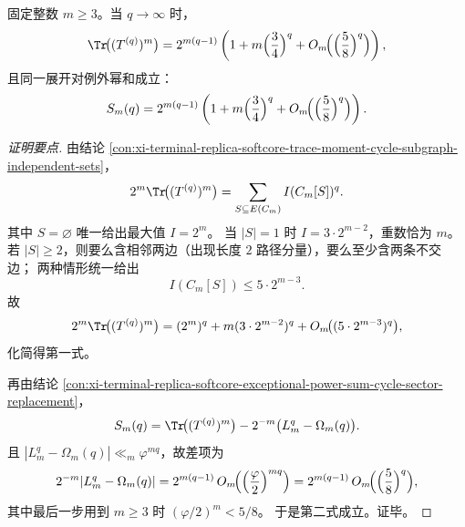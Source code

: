 \begin{conclusion}\label{con:xi-terminal-replica-softcore-large-q-two-layer-asymptotics}
固定整数 \(m\ge 3\)。当 \(q\to\infty\) 时，
\[
\Tr\!\bigl((T^{(q)})^m\bigr)
=2^{m(q-1)}
\left(
1+m\Bigl(\frac34\Bigr)^q+O_m\!\Bigl(\Bigl(\frac58\Bigr)^q\Bigr)
\right),
\]
且同一展开对例外幂和成立：
\[
S_m(q)
=2^{m(q-1)}
\left(
1+m\Bigl(\frac34\Bigr)^q+O_m\!\Bigl(\Bigl(\frac58\Bigr)^q\Bigr)
\right).
\]
\end{conclusion}
\begin{proof}[证明要点]
由结论 \ref{con:xi-terminal-replica-softcore-trace-moment-cycle-subgraph-independent-sets}，
\[
2^m\Tr\!\bigl((T^{(q)})^m\bigr)=\sum_{S\subseteq E(C_m)}I(C_m[S])^{q}.
\]
其中 \(S=\varnothing\) 唯一给出最大值 \(I=2^m\)。
当 \(|S|=1\) 时 \(I=3\cdot 2^{m-2}\)，重数恰为 \(m\)。
若 \(|S|\ge 2\)，则要么含相邻两边（出现长度 \(2\) 路径分量），要么至少含两条不交边；
两种情形统一给出
\[
I(C_m[S])\le 5\cdot 2^{m-3}.
\]
故
\[
2^m\Tr\!\bigl((T^{(q)})^m\bigr)
=(2^m)^q+m(3\cdot 2^{m-2})^q+O_m\!\bigl((5\cdot 2^{m-3})^q\bigr),
\]
化简得第一式。
\par
再由结论 \ref{con:xi-terminal-replica-softcore-exceptional-power-sum-cycle-sector-replacement}，
\[
S_m(q)=\Tr\!\bigl((T^{(q)})^m\bigr)-2^{-m}\bigl(L_m^q-\Omega_m(q)\bigr).
\]
且 \(|L_m^q-\Omega_m(q)|\ll_m \varphi^{mq}\)，故差项为
\[
2^{-m}|L_m^q-\Omega_m(q)|
=2^{m(q-1)}\,O_m\!\Bigl(\Bigl(\frac{\varphi}{2}\Bigr)^{mq}\Bigr)
=2^{m(q-1)}\,O_m\!\Bigl(\Bigl(\frac58\Bigr)^q\Bigr),
\]
其中最后一步用到 \(m\ge 3\) 时 \((\varphi/2)^m<5/8\)。
于是第二式成立。证毕。
\end{proof}

